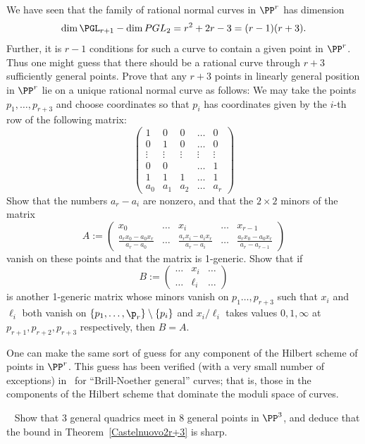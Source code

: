 \begin{exercise}\label{r+3 exercise}
We have seen that the family of rational normal curves in $\PP^{r}$ has dimension 
$$
\dim \PGL_{r+1} - \dim PGL_{2} = r^{2}+2r-3 = (r-1)(r+3).
$$
Further, it is $r-1$ conditions for such a curve to contain a given point in $\PP^{r}$. Thus one might guess
that there should be a rational curve through $r+3$ sufficiently general points. 
Prove that any $r+3$ points in linearly general position in $\PP^r$ lie on a unique rational normal curve as follows:
 We may take the points $p_1,\dots,p_{r+3}$ and choose coordinates so that $p_i$ has coordinates given by the $i$-th row of the following matrix:
$$
\begin{pmatrix}
 1&0&0&\dots&0\\
 0&1&0&\dots&0\\
 \vdots &\vdots&\vdots&\vdots&\vdots \\
 0&0&&\dots&1\\
 1&1&1&\dots&1\\
 a_0&a_1&a_2&\dots&a_{r}
 \end{pmatrix}
$$
Show that the numbers $a_r-a_i$ are nonzero, and that the $2\times 2$ minors of the matrix
$$
A := \begin{pmatrix}
 x_0&\dots&x_i&\dots& x_{r-1}\\
\frac{a_rx_0-a_0x_r}{a_r-a_0}&\dots&\frac{a_rx_i-a_ix_r}{a_r-a_i}&\dots&\frac{a_rx_0-a_0x_r}{a_r-a_{r-1}} 
\end{pmatrix}
$$
vanish on these points and that the matrix is 1-generic. Show that if 
$$
B:= \begin{pmatrix}
 \dots& x_i&\dots\\
 \dots& \ell_i &\dots
\end{pmatrix}
$$
is another 1-generic matrix whose minors vanish on $p_1\dots, p_{r+3}$ such that $x_i$ and $\ell_i$ both vanish on
$\{p_1,\dots, \p_r\} \setminus \{p_i\}$ and
$x_i/\ell_i$ takes values $0,1,\infty$ at $p_{r+1},p_{r+2},p_{r+3}$ respectively, then $B= A$.

One can make the same sort of guess for any component of the Hilbert scheme of points in $\PP^{r}$. This guess has
 been verified (with a very small number of exceptions) in~\cite{MR4220034} for ``Brill-Noether general'' curves;
that is, those in the components
of the Hilbert scheme that dominate the moduli space of curves.
\end{exercise}


\begin{exercise}~\label{2r+3 is sharp}
Show that 3 general quadrics meet in 8 general points in $\PP^3$, and deduce that the bound in Theorem~\ref{Castelnuovo2r+3}
is sharp.
\end{exercise}

